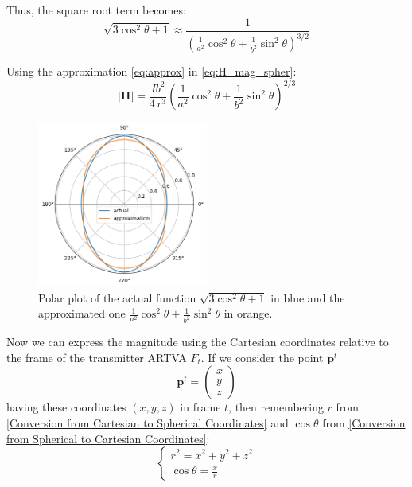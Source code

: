 
Thus, the square root term becomes:
\begin{equation}
    \sqrt{ 3 \cos^2 \theta + 1} \approx \frac{1}{\left(\frac{1}{a^2} \cos^2 \theta + \frac{1}{b^2} \sin^2 \theta\right)^{3/2}}
    \label{eq:approx}
\end{equation}

Using the approximation \eqref{eq:approx} in \eqref{eq:H_mag_spher}:
\begin{equation}
    \left| \mathbf{H} \right| = \frac{I b^2}{4 \, r^3} \left(\frac{1}{a^2} \cos^2 \theta + \frac{1}{b^2} \sin^2 \theta\right)^{2/3}
    \label{eq:H_mag_approx}
\end{equation}

\begin{figure}[h!]
\centering
\includegraphics[width=0.5\textwidth]{images/polar_plot.png}
\caption{Polar plot of the actual function $\sqrt{ 3 \cos^2 \theta + 1} $ in blue and the approximated one $\frac{1}{a^2 }\cos^2 \theta + \frac{1}{b^2} \sin^2 \theta$ in orange.}
\label{fig:polarplot}
\end{figure}

Now we can express the magnitude using the Cartesian coordinates relative to the frame of the transmitter ARTVA $F_t$. If we consider the point $\mathbf{p}^t$\[
\mathbf{p}^t = \begin{pmatrix}
    x \\
    y \\
    z
\end{pmatrix}
\] having these coordinates $(x,y,z)$ in frame $t$, then remembering $r$ from \ref{Conversion from Cartesian to Spherical Coordinates} and $\cos\theta$ from \ref{Conversion from Spherical to Cartesian Coordinates}:
\[
\begin{cases}
r^2 = x^2 + y^2 + z^2 \\
\cos\theta = \frac{x}{r}
\end{cases}
\]


